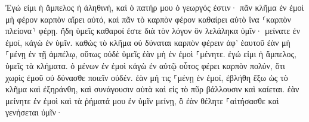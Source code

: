 \documentclass{openreader}
\begin{document}
Ἐγώ εἰμι ἡ ἄμπελος ἡ ἀληθινή, καὶ ὁ πατήρ μου ὁ γεωργός ἐστιν· 
πᾶν κλῆμα ἐν ἐμοὶ μὴ φέρον καρπὸν αἴρει αὐτό, καὶ πᾶν τὸ καρπὸν φέρον καθαίρει αὐτὸ ἵνα ⸂καρπὸν πλείονα⸃ φέρῃ. 
ἤδη ὑμεῖς καθαροί ἐστε διὰ τὸν λόγον ὃν λελάληκα ὑμῖν· 
μείνατε ἐν ἐμοί, κἀγὼ ἐν ὑμῖν. καθὼς τὸ κλῆμα οὐ δύναται καρπὸν φέρειν ἀφ’ ἑαυτοῦ ἐὰν μὴ ⸀μένῃ ἐν τῇ ἀμπέλῳ, οὕτως οὐδὲ ὑμεῖς ἐὰν μὴ ἐν ἐμοὶ ⸀μένητε. 
ἐγώ εἰμι ἡ ἄμπελος, ὑμεῖς τὰ κλήματα. ὁ μένων ἐν ἐμοὶ κἀγὼ ἐν αὐτῷ οὗτος φέρει καρπὸν πολύν, ὅτι χωρὶς ἐμοῦ οὐ δύνασθε ποιεῖν οὐδέν. 
ἐὰν μή τις ⸀μένῃ ἐν ἐμοί, ἐβλήθη ἔξω ὡς τὸ κλῆμα καὶ ἐξηράνθη, καὶ συνάγουσιν αὐτὰ καὶ εἰς τὸ πῦρ βάλλουσιν καὶ καίεται. 
ἐὰν μείνητε ἐν ἐμοὶ καὶ τὰ ῥήματά μου ἐν ὑμῖν μείνῃ, ὃ ἐὰν θέλητε ⸀αἰτήσασθε καὶ γενήσεται ὑμῖν· 
\end{document}
